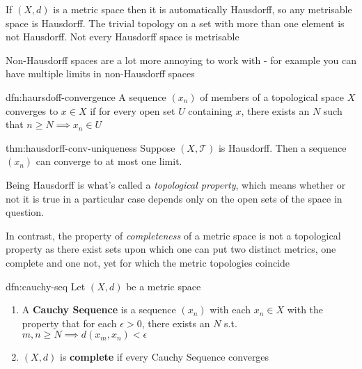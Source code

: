 \documentclass{article}
\begin{document}
If $(X, d)$ is a metric space then it is automatically Hausdorff, so any metrisable space is Hausdorff. The trivial topology on a set with more than one element is not Hausdorff. Not every Hausdorff space is metrisable

Non-Hausdorff spaces are a lot more annoying to work with - for example you can have multiple limits in non-Hausdorff spaces

\begin{dfn}{dfn:haursdoff-convergence}{}
    A sequence $(x_{n})$ of members of a topological space $X$ converges to $x\in X$ if for every open set $U$ containing $x$, there exists an $N$ such that $n\ge N \implies x_{n}\in U$
\end{dfn}

\begin{thm}{thm:hausdorff-conv-uniqueness}{}
    Suppose $(X, \mathcal{T})$ is Hausdorff. Then a sequence $(x_{n})$ can converge to at most one limit.
\end{thm}

Being Hausdorff is what's called a \textit{topological property}, which means whether or not it is true in a particular case depends only on the open sets of the space in question.

In contrast, the property of \textit{completeness} of a metric space is not a topological property as there exist sets upon which one can put two distinct metrics, one complete and one not, yet for which the metric topologies coincide

\begin{dfn}{dfn:cauchy-seq}{}
    Let $(X, d)$ be a metric space
    \begin{enumerate}
        \item A \textbf{Cauchy Sequence} is a sequence $(x_{n})$ with each $x_{n}\in X$ with the property that for each $\epsilon > 0$, there exists an $N$ s.t. $m,n\ge N \implies d(x_{m}, x_{n}) < \epsilon$
        \item $(X, d)$ is \textbf{complete} if every Cauchy Sequence converges
    \end{enumerate}
\end{dfn}
\end{document}
